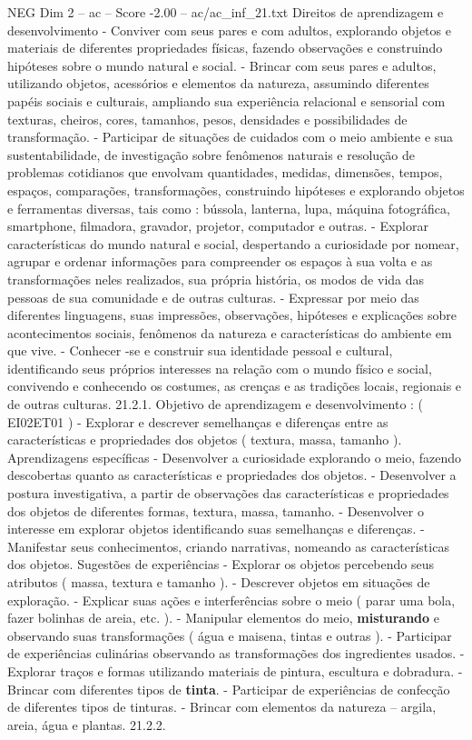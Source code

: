 \begin{textsample}{NEG Dim 2 – ac – Score -2.00 – ac/ac\_inf\_21.txt}
Direitos de aprendizagem e desenvolvimento - Conviver com seus pares e com adultos, explorando objetos e materiais de diferentes propriedades físicas, fazendo observações e construindo hipóteses sobre o mundo natural e social. - Brincar com seus pares e adultos, utilizando objetos, acessórios e elementos da natureza, assumindo diferentes papéis sociais e culturais, ampliando sua experiência relacional e sensorial com texturas, cheiros, cores, tamanhos, pesos, densidades e possibilidades de transformação. - Participar de situações de cuidados com o meio ambiente e sua sustentabilidade, de investigação sobre fenômenos naturais e resolução de problemas cotidianos que envolvam quantidades, medidas, dimensões, tempos, espaços, comparações, transformações, construindo hipóteses e explorando objetos e ferramentas diversas, tais como : bússola, lanterna, lupa, máquina fotográfica, smartphone, filmadora, gravador, projetor, computador e outras. - Explorar características do mundo natural e social, despertando a curiosidade por nomear, agrupar e ordenar informações para compreender os espaços à sua volta e as transformações neles realizados, sua própria história, os modos de vida das pessoas de sua comunidade e de outras culturas. - Expressar por meio das diferentes linguagens, suas impressões, observações, hipóteses e explicações sobre acontecimentos sociais, fenômenos da natureza e características do ambiente em que vive. - Conhecer -se e construir sua identidade pessoal e cultural, identificando seus próprios interesses na relação com o mundo físico e social, convivendo e conhecendo os costumes, as crenças e as tradições locais, regionais e de outras culturas. 21.2.1.
Objetivo de aprendizagem e desenvolvimento : ( EI02ET01 ) - Explorar e descrever semelhanças e diferenças entre as características e propriedades dos objetos ( textura, massa, tamanho ).
Aprendizagens específicas - Desenvolver a curiosidade explorando o meio, fazendo descobertas quanto as características e propriedades dos objetos. - Desenvolver a postura investigativa, a partir de observações das características e propriedades dos objetos de diferentes formas, textura, massa, tamanho. - Desenvolver o interesse em explorar objetos identificando suas semelhanças e diferenças. - Manifestar seus conhecimentos, criando narrativas, nomeando as características dos objetos.
Sugestões de experiências - Explorar os objetos percebendo seus atributos ( massa, textura e tamanho ). - Descrever objetos em situações de exploração. - Explicar suas ações e interferências sobre o meio ( parar uma bola, fazer bolinhas de areia, etc. ). - Manipular elementos do meio, \textbf{misturando} e observando suas transformações ( água e maisena, tintas e outras ). - Participar de experiências culinárias observando as transformações dos ingredientes usados. - Explorar traços e formas utilizando materiais de pintura, escultura e dobradura. - Brincar com diferentes tipos de \textbf{tinta}. - Participar de experiências de confecção de diferentes tipos de tinturas. - Brincar com elementos da natureza – argila, areia, água e plantas. 21.2.2.

\end{textsample}
